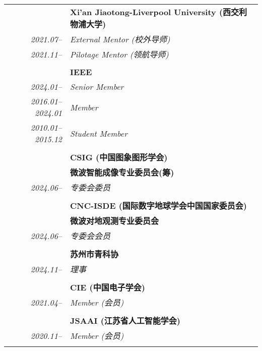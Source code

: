 \documentclass[paper=a4,fontsize=11pt]{scrartcl}
\begin{document}
\begin{longtable}{r|p{11cm}}
	
	~ & \textbf{Xi'an Jiaotong-Liverpool University (西交利物浦大学)}\\
	\emph{2021.07--} & \emph{External Mentor (校外导师)}\\
	\emph{2021.11--} & \emph{Pilotage Mentor (领航导师)}\\
	\multicolumn{2}{c}{} \\
	
	
	
	~ & \textbf{IEEE}\\
	\emph{2024.01--} & \emph{Senior Member}\\
	\emph{2016.01--2024.01} & \emph{Member}\\
	\emph{2010.01--2015.12} & \emph{Student Member}\\
	\multicolumn{2}{c}{} \\
	
	~ & \textbf{CSIG (中国图象图形学会)}\\
	~ & \textbf{微波智能成像专业委员会(筹)} \\
	\emph{2024.06--} & \emph{专委会委员}\\
	\multicolumn{2}{c}{} \\
	
	~ & \textbf{CNC-ISDE (国际数字地球学会中国国家委员会)}\\
	~ & \textbf{微波对地观测专业委员会}\\
	\emph{2024.06--} & \emph{专委会会员}\\
	\multicolumn{2}{c}{} \\
	
	~ & \textbf{苏州市青科协}\\
	\emph{2024.11--} & \emph{理事}\\
	\multicolumn{2}{c}{} \\
	
	
	~ & \textbf{CIE (中国电子学会)} \\
	\emph{2021.04--} & \emph{Member (会员)}\\
	\multicolumn{2}{c}{} \\
	

	
	
	~ & \textbf{JSAAI (江苏省人工智能学会)} \\
	\emph{2020.11--} & \emph{Member (会员)}\\
	\multicolumn{2}{c}{} 
	
	
\end{longtable}
\end{document}
